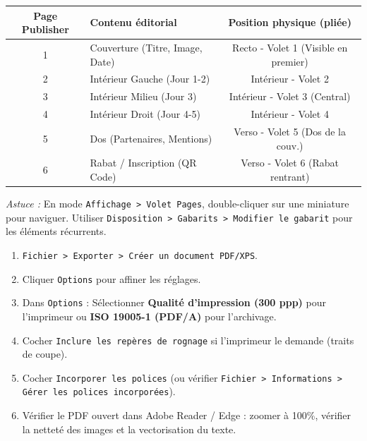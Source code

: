 \documentclass[11pt]{article}
\begin{document}
\begin{propriete}
\begin{center}
\begin{tabularx}{\linewidth}{|c|X|c|}\hline
\textbf{Page Publisher} & \textbf{Contenu éditorial} & \textbf{Position physique (pliée)} \\\hline
1 & Couverture (Titre, Image, Date) & Recto - Volet 1 (Visible en premier) \\\hline
2 & Intérieur Gauche (Jour 1-2) & Intérieur - Volet 2 \\\hline
3 & Intérieur Milieu (Jour 3) & Intérieur - Volet 3 (Central) \\\hline
4 & Intérieur Droit (Jour 4-5) & Intérieur - Volet 4 \\\hline
5 & Dos (Partenaires, Mentions) & Verso - Volet 5 (Dos de la couv.) \\\hline
6 & Rabat / Inscription (QR Code) & Verso - Volet 6 (Rabat rentrant) \\\hline
\end{tabularx}
\end{center}
\emph{Astuce :} En mode \texttt{Affichage > Volet Pages}, double-cliquer sur une miniature pour naviguer. Utiliser \texttt{Disposition > Gabarits > Modifier le gabarit} pour les éléments récurrents.
\end{propriete}

\begin{methode}
\begin{enumerate}
    \item \texttt{Fichier > Exporter > Créer un document PDF/XPS}.
    \item Cliquer \texttt{Options} pour affiner les réglages.
    \item Dans \texttt{Options} : Sélectionner \textbf{Qualité d'impression (300 ppp)} pour l'imprimeur ou \textbf{ISO 19005-1 (PDF/A)} pour l'archivage.
    \item Cocher \texttt{Inclure les repères de rognage} si l'imprimeur le demande (traits de coupe).
    \item Cocher \texttt{Incorporer les polices} (ou vérifier \texttt{Fichier > Informations > Gérer les polices incorporées}).
    \item Vérifier le PDF ouvert dans Adobe Reader / Edge : zoomer à 100\%, vérifier la netteté des images et la vectorisation du texte.
\end{enumerate}
\end{methode}
\end{document}

